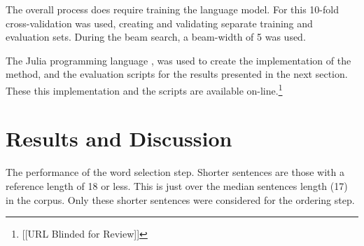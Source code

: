 \documentclass[11pt]{article}
\theoremstyle{plain}
\theoremstyle{definition}
\begin{document}
The overall process does require training the language model. For this 10-fold cross-validation was used, creating and validating separate training and evaluation sets. During the beam search, a beam-width of 5 was used.

The Julia programming language \parencite{Julia}, was used to create the implementation of the method, and the evaluation scripts for the results presented in the next section. These this implementation  and the scripts are available on-line.\footnote{[[URL Blinded for Review]]}

\section{Results and Discussion} \label{results}

\begin{table}
	\caption{ The performance of the word selection step. Shorter sentences are those with a reference length of 18 or less. This is just over the median sentences length (17) in the corpus. Only these shorter sentences were considered for the ordering step.}
	\label{table:overall}
\end{table}
\end{document}
